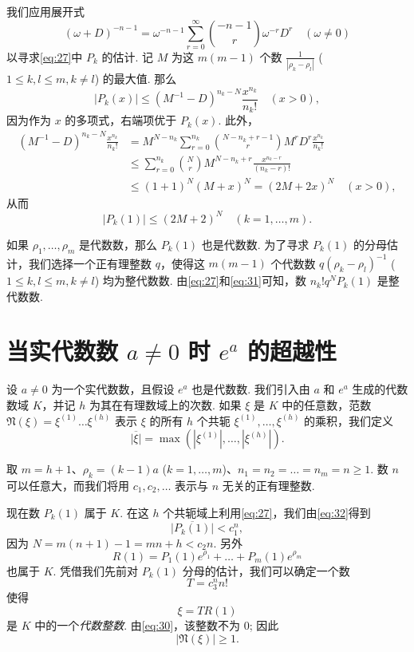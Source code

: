 我们应用展开式
\begin{equation} (\omega + D)^{-n-1} = \omega^{-n-1} \sum_{r=0}^{\infty} \binom{-n-1}{r} \omega^{-r} D^r \quad (\omega \neq 0) \tag{31}\label{eq:31} \end{equation}
以寻求\eqref{eq:27}中 $P_k$ 的估计. 记 $M$ 为这 $m(m-1)$ 个数 $\frac{1}{|\rho_k - \rho_l|}$ ($1 \leq k, l \leq m, k \neq l$) 的最大值. 那么
\[ |P_{k}(x)| \le (M^{-1} - D)^{n_{k} - N} \frac{x^{n_{k}}}{n_{k}!} \quad (x>0), \]
因为作为 $x$ 的多项式，右端项优于 $P_k(x)$. 此外，
\[ \begin{aligned} (M^{-1} - D)^{n_k - N} \frac{x^{n_k}}{n_k!} &= M^{N - n_k} \sum_{r=0}^{n_k} \binom{N - n_k + r - 1}{r} M^r D^r \frac{x^{n_k}}{n_k!} \\ &\leq \sum_{r=0}^{n_k} \binom{N}{r} M^{N-n_k+r} \frac{x^{n_k-r}}{(n_k-r)!} \\ &\leq (1+1)^N (M+x)^N = (2M+2x)^N \quad (x>0), \end{aligned} \]
从而
\begin{equation} |P_{k}(1)| \le (2M+2)^{N} \quad (k=1,\dots,m). \tag{32}\label{eq:32} \end{equation}

如果 $\rho_1, \dots, \rho_m$ 是代数数，那么 $P_k(1)$ 也是代数数. 为了寻求 $P_k(1)$ 的分母估计，我们选择一个正有理整数 $q$，使得这 $m(m-1)$ 个代数数 $q(\rho_k - \rho_l)^{-1}$ ($1 \leq k, l \leq m, k \neq l$) 均为整代数数. 由\eqref{eq:27}和\eqref{eq:31}可知，数 $n_k! q^N P_k(1)$ 是整代数数.

\section{当实代数数 $a \neq 0$ 时 $e^a$ 的超越性}

设 $a \neq 0$ 为一个实代数数，且假设 $e^a$ 也是代数数. 我们引入由 $a$ 和 $e^a$ 生成的代数数域 $K$，并记 $h$ 为其在有理数域上的次数. 如果 $\xi$ 是 $K$ 中的任意数，范数 $\mathfrak{N}(\xi) = \xi^{(1)} \dots \xi^{(h)}$ 表示 $\xi$ 的所有 $h$ 个共轭 $\xi^{(1)}, \dots, \xi^{(h)}$ 的乘积，我们定义
\[ \overline{|\xi|} = \max (|\xi^{(1)}|, \ldots, |\xi^{(h)}|). \]

取 $m=h+1$、$\rho_k=(k-1)a$ ($k=1,\dots,m$)、$n_1=n_2=\dots=n_m=n \geq 1$. 数 $n$ 可以任意大，而我们将用 $c_1, c_2, \dots$ 表示与 $n$ 无关的正有理整数.

现在数 $P_k(1)$ 属于 $K$. 在这 $h$ 个共轭域上利用\eqref{eq:27}，我们由\eqref{eq:32}得到
\begin{equation} \overline{|P_{k}(1)|} < c_{1}^{n}, \tag{33}\label{eq:33} \end{equation}
因为 $N=m(n+1)-1=mn+h < c_2 n$. 另外
\[ R(1) = P_1(1) e^{\rho_1} + \dots + P_m(1) e^{\rho_m} \]
也属于 $K$. 凭借我们先前对 $P_k(1)$ 分母的估计，我们可以确定一个数
\begin{equation} T = c_3^n n! \tag{34}\label{eq:34} \end{equation}
使得
\[ \xi = TR(1) \]
是 $K$ 中的一个\textit{代数整数}. 由\eqref{eq:30}，该整数不为 0; 因此
\begin{equation} |\mathfrak{N}(\xi)| \geq 1. \tag{35}\label{eq:35} \end{equation}

